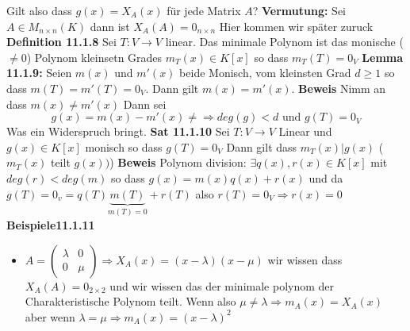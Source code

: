 \documentclass{article}
\begin{document}
Gilt also dass $g(x)=X_A(x)$ für jede Matrix $A$?
\newline
\textbf{Vermutung:} Sei $A\in M_{n\times n}(K)$ dann ist $X_A(A)=0_{n \times n}$ Hier kommen wir später zuruck
\newline\textbf{Definition 11.1.8} Sei $T:V\rightarrow V$ linear. Das minimale Polynom ist das monische ($\neq 0$) Polynom kleinsetn Grades $m_T(x)\in K[x]$ so dass $m_T(T)=0_V$
\newline \textbf{Lemma 11.1.9:} Seien $m(x)$ und $m'(x)$ beide Monisch, vom kleinsten Grad $d\ge1$ so dass $m(T)=m'(T)=0_V$. Dann gilt $m(x)=m'(x)$.\newline
\textbf{Beweis} Nimm an dass $m(x)\neq m'(x)$ Dann sei \[g(x)=m(x)-m'(x)\neq\Rightarrow deg(g)<d\text{ und } g(T)=0_V\]Was ein Widerspruch bringt.\newline
\textbf{Sat 11.1.10} Sei $T:V\rightarrow V$ Linear und $g(x)\in K[x]$ monisch so dass $g(T)=0_V$ Dann gilt dass $m_T(x)|g(x)$ ($m_T(x)$ teilt $g(x))$)
\newline\textbf{Beweis} Polynom division: $\exists q(x), r(x)\in K[x]$ mit $deg(r)<deg(m)$ so dass $g(x)=m(x)q(x)+r(x)$ und da $g(T)=0_v=q(T)\underset{m(T)=0}{\underbrace{m(T)}}+r(T)$ also $r(T)=0_V\Rightarrow r(x)=0$ 
\newline\textbf{Beispiele{11.1.11}}
\begin{itemize}
  \item{$A=\begin{pmatrix}\lambda&0\\0&\mu\end{pmatrix}\Rightarrow X_A(x)=(x-\lambda)(x-\mu)$ wir wissen dass $X_A(A)=0_{2\times 2}$ und wir wissen das der minimale polynom der Charakteristische Polynom teilt. Wenn also $\mu\neq\lambda\Rightarrow m_A(x)=X_A(x)$ aber wenn $\lambda=\mu\Rightarrow m_A(x)=(x-\lambda)^2$}
\end{itemize}
\end{document}
